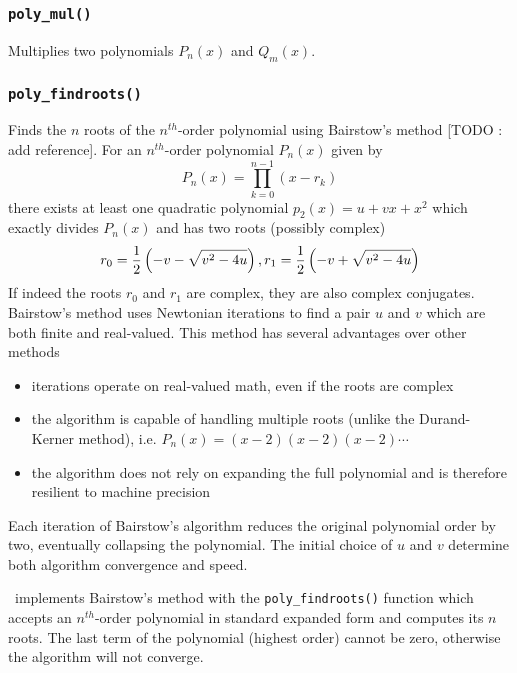 \subsubsection{{\tt poly\_mul()}}
\label{module:math:poly:polyf_mul}
Multiplies two polynomials $P_n(x)$ and $Q_m(x)$.


\subsubsection{{\tt poly\_findroots()}}
\label{module:math:poly:polyf_findroots}
Finds the $n$ roots of the $n^{th}$-order polynomial using Bairstow's method
[TODO : add reference].
For an $n^{th}$-order polynomial $P_n(x)$ given by
%
\begin{equation}
\label{eqn:math:poly:roots}
    P_n(x) = \prod_{k=0}^{n-1}{(x-r_k)}
\end{equation}
%
there exists at least one quadratic polynomial $p_{2}(x)=u + vx + x^2$ which
exactly divides $P_{n}(x)$ and has two roots (possibly complex)
%
\begin{equation}
\label{eqn:math:poly:complex_roots}
    r_0 = \frac{1}{2}\left(-v-\sqrt{v^2-4u}\right), \; \\
    r_1 = \frac{1}{2}\left(-v+\sqrt{v^2-4u}\right)
\end{equation}
%
If indeed the roots $r_0$ and $r_1$ are complex, they are also complex
conjugates.
Bairstow's method uses Newtonian iterations to find a pair $u$ and $v$ which
are both finite and real-valued.
This method has several advantages over other methods
\begin{itemize}
\item iterations operate on real-valued math, even if the roots are complex
\item the algorithm is capable of handling multiple roots (unlike the
      Durand-Kerner method), i.e. $P_{n}(x) = (x-2)(x-2)(x-2)\cdots$
\item the algorithm does not rely on expanding the full polynomial and is
      therefore resilient to machine precision
\end{itemize}
Each iteration of Bairstow's algorithm reduces the original polynomial order
by two, eventually collapsing the polynomial.
The initial choice of $u$ and $v$ determine both algorithm convergence and
speed.

\liquid\ implements Bairstow's method with the {\tt poly\_findroots()}
function which accepts an $n^{th}$-order polynomial in standard expanded form
and computes its $n$ roots.
The last term of the polynomial (highest order) cannot be zero, otherwise the
algorithm will not converge.


